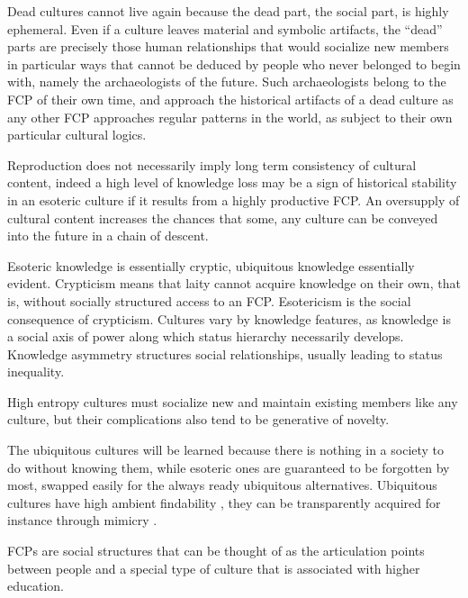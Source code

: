 \documentclass[]{book}
\theoremstyle{definition}
\theoremstyle{definition}
\theoremstyle{definition}
\theoremstyle{remark}
\begin{document}
Dead cultures cannot live again because the dead part, the social part,
is highly ephemeral. Even if a culture leaves material and symbolic
artifacts, the ``dead'' parts are precisely those human relationships
that would socialize new members in particular ways that cannot be
deduced by people who never belonged to begin with, namely the
archaeologists of the future. Such archaeologists belong to the FCP of
their own time, and approach the historical artifacts of a dead culture
as any other FCP approaches regular patterns in the world, as subject to
their own particular cultural logics.

Reproduction does not necessarily imply long term consistency of
cultural content, indeed a high level of knowledge loss may be a sign of
historical stability in an esoteric culture if it results from a highly
productive FCP. An oversupply of cultural content increases the chances
that some, any culture can be conveyed into the future in a chain of
descent.

Esoteric knowledge is essentially cryptic, ubiquitous knowledge
essentially evident. Crypticism means that laity cannot acquire
knowledge on their own, that is, without socially structured access to
an FCP. Esotericism is the social consequence of crypticism. Cultures
vary by knowledge features, as knowledge is a social axis of power along
which status hierarchy necessarily develops. Knowledge asymmetry
structures social relationships, usually leading to status inequality.

High entropy cultures must socialize new and maintain existing members
like any culture, but their complications also tend to be generative of
novelty.

The ubiquitous cultures will be learned because there is nothing in a
society to do without knowing them, while esoteric ones are guaranteed
to be forgotten by most, swapped easily for the always ready ubiquitous
alternatives. Ubiquitous cultures have high ambient findability
\citep{Morville2009Ambient}, they can be transparently acquired for
instance through mimicry \citep{DiMaggio1983Iron}.

FCPs are social structures that can be thought of as the articulation
points between people and a special type of culture that is associated
with higher education.
\end{document}
